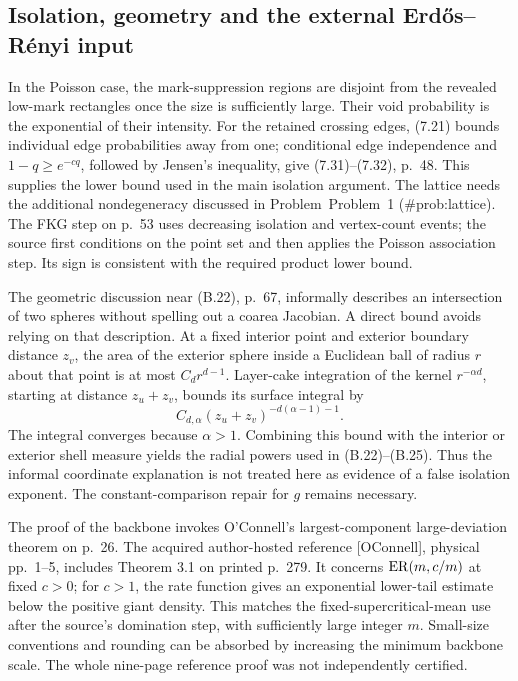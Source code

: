 \documentclass[10pt]{article}
\begin{document}
\subsection*{Isolation, geometry and the external Erdős–Rényi input}
In the Poisson case, the mark-suppression regions are disjoint from the revealed low-mark rectangles once the size is sufficiently large. Their void probability is the exponential of their intensity. For the retained crossing edges, (7.21) bounds individual edge probabilities away from one; conditional edge independence and \(1-q\geq e^{-c q}\), followed by Jensen’s inequality, give (7.31)–(7.32), p. 48. This supplies the lower bound used in the main isolation argument. The lattice needs the additional nondegeneracy discussed in Problem Problem 1 (\#prob:lattice). The FKG step on p. 53 uses decreasing isolation and vertex-count events; the source first conditions on the point set and then applies the Poisson association step. Its sign is consistent with the required product lower bound.\par
The geometric discussion near (B.22), p. 67, informally describes an intersection of two spheres without spelling out a coarea Jacobian. A direct bound avoids relying on that description. At a fixed interior point and exterior boundary distance \(z_v\), the area of the exterior sphere inside a Euclidean ball of radius \(r\) about that point is at most \(C_d r^{d-1}\). Layer-cake integration of the kernel \(r^{-\alpha d}\), starting at distance \(z_u+z_v\), bounds its surface integral by \[C_{d,\alpha}(z_u+z_v)^{-d(\alpha-1)-1}.\] The integral converges because \(\alpha>1\). Combining this bound with the interior or exterior shell measure yields the radial powers used in (B.22)–(B.25). Thus the informal coordinate explanation is not treated here as evidence of a false isolation exponent. The constant-comparison repair for \(g\) remains necessary.\par
The proof of the backbone invokes O’Connell’s largest-component large-deviation theorem on p. 26. The acquired author-hosted reference [OConnell], physical pp. 1–5, includes Theorem 3.1 on printed p. 279. It concerns \({\rm ER}(m,c/m)\) at fixed \(c>0\); for \(c>1\), the rate function gives an exponential lower-tail estimate below the positive giant density. This matches the fixed-supercritical-mean use after the source’s domination step, with sufficiently large integer \(m\). Small-size conventions and rounding can be absorbed by increasing the minimum backbone scale. The whole nine-page reference proof was not independently certified.\par
\end{document}
